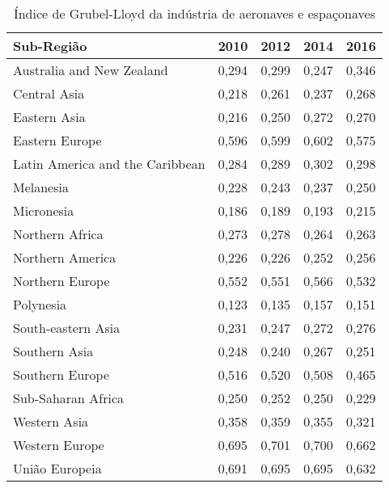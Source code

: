 \begin{table}
\centering
\caption{Índice de Grubel-Lloyd da indústria de aeronaves e espaçonaves}
\label{tab:ex6-gl}
\begin{tabular}{p{6cm}p{1.5cm}p{1.5cm}p{1.5cm}p{1.5cm}}
\toprule
                     Sub-Região &  2010 &  2012 &  2014 &  2016 \\
\midrule
      Australia and New Zealand & 0,294 & 0,299 & 0,247 & 0,346 \\
                   Central Asia & 0,218 & 0,261 & 0,237 & 0,268 \\
                   Eastern Asia & 0,216 & 0,250 & 0,272 & 0,270 \\
                 Eastern Europe & 0,596 & 0,599 & 0,602 & 0,575 \\
Latin America and the Caribbean & 0,284 & 0,289 & 0,302 & 0,298 \\
                      Melanesia & 0,228 & 0,243 & 0,237 & 0,250 \\
                     Micronesia & 0,186 & 0,189 & 0,193 & 0,215 \\
                Northern Africa & 0,273 & 0,278 & 0,264 & 0,263 \\
               Northern America & 0,226 & 0,226 & 0,252 & 0,256 \\
                Northern Europe & 0,552 & 0,551 & 0,566 & 0,532 \\
                      Polynesia & 0,123 & 0,135 & 0,157 & 0,151 \\
             South-eastern Asia & 0,231 & 0,247 & 0,272 & 0,276 \\
                  Southern Asia & 0,248 & 0,240 & 0,267 & 0,251 \\
                Southern Europe & 0,516 & 0,520 & 0,508 & 0,465 \\
             Sub-Saharan Africa & 0,250 & 0,252 & 0,250 & 0,229 \\
                   Western Asia & 0,358 & 0,359 & 0,355 & 0,321 \\
                 Western Europe & 0,695 & 0,701 & 0,700 & 0,662 \\
\midrule
                 União Europeia & 0,691 & 0,695 & 0,695 & 0,632 \\
\bottomrule
\end{tabular}
\end{table}
